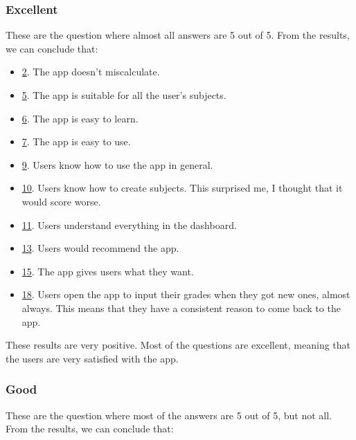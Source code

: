 \subsubsection{Excellent}

These are the question where almost all answers are 5 out of 5. From the results, we can conclude that:
\begin{itemize}[noitemsep]
    \item \hyperref[fig:question-plot-2]{2}. 
        The app doesn't miscalculate.
    \item \hyperref[fig:question-plot-5]{5}. 
        The app is suitable for all the user's subjects. 
    \item \hyperref[fig:question-plot-6]{6}. 
        The app is easy to learn.
    \item \hyperref[fig:question-plot-7]{7}. 
        The app is easy to use.
    \item \hyperref[fig:question-plot-9]{9}. 
        Users know how to use the app in general.
    \item \hyperref[fig:question-plot-10]{10}. 
        Users know how to create subjects. This surprised me, I thought that it would score worse.
    \item \hyperref[fig:question-plot-11]{11}. 
        Users understand everything in the dashboard.
    \item \hyperref[fig:question-plot-13]{13}. 
        Users would recommend the app.
    \item \hyperref[fig:question-plot-15]{15}. 
        The app gives users what they want.
    \item \hyperref[fig:question-plot-18]{18}. 
        Users open the app to input their grades when they got new ones, almost always. This means that they have a consistent reason to come back to the app.
\end{itemize}

\noindent
These results are very positive. Most of the questions are excellent, meaning that the users are very satisfied with the app.

\subsubsection{Good}

These are the question where most of the answers are 5 out of 5, but not all. From the results, we can conclude that:

